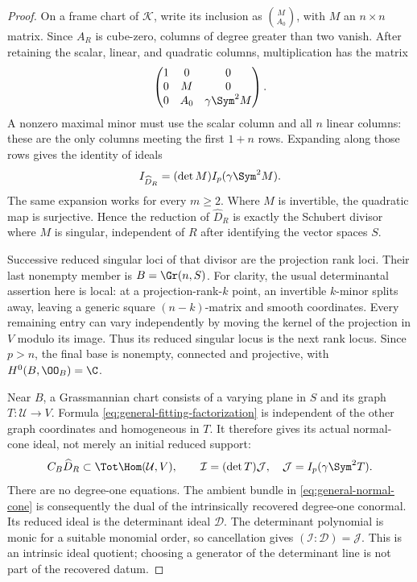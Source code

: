 \begin{proof}
On a frame chart of \(\mathcal K\), write its inclusion as
\(\binom M{A_0}\), with \(M\) an \(n\times n\) matrix.  Since
\(A_R\) is cube-zero, columns of degree greater than two vanish.
After retaining the scalar, linear, and quadratic columns, multiplication
has the matrix
\begin{equation}\label{eq:general-multiplication-matrix}
 \begin{pmatrix}
  1&0&0\\
  0&M&0\\
  0&A_0&\gamma\Sym^2M
 \end{pmatrix}.
\end{equation}
A nonzero maximal minor must use the scalar column and all \(n\)
linear columns: these are the only columns meeting the first \(1+n\)
rows.  Expanding along those rows gives the identity of ideals
\begin{equation}\label{eq:general-fitting-factorization}
 I_{\widehat D_R}=(\det M)I_p(\gamma\Sym^2M).
\end{equation}
The same expansion works for every \(m\ge2\).  Where \(M\) is
invertible, the quadratic map is surjective.  Hence the reduction of
\(\widehat D_R\) is exactly the Schubert divisor where \(M\)
is singular, independent of \(R\) after identifying the vector
spaces \(S\).

Successive reduced singular loci of that divisor are the projection
rank loci.  Their last nonempty member is \(B=\Gr(n,S)\).
For clarity, the usual determinantal assertion here is local: at a
projection-rank-\(k\) point, an invertible \(k\)-minor splits
away, leaving a generic square \((n-k)\)-matrix and smooth
coordinates.  Every remaining entry can vary independently by
moving the kernel of the projection in \(V\) modulo its image.
Thus its reduced singular locus is the next rank locus.  Since
\(p>n\), the final base is nonempty, connected and projective,
with \(H^0(B,\OO_B)=\C\).

Near \(B\), a Grassmannian chart consists of a varying plane in
\(S\) and its graph \(T:\mathcal U\to V\).  Formula
\eqref{eq:general-fitting-factorization} is independent of the other
graph coordinates and homogeneous in \(T\).  It therefore gives
its actual normal-cone ideal, not merely an initial reduced support:
\begin{equation}\label{eq:general-normal-cone}
 C_B\widehat D_R\subset\Tot\Hom(\mathcal U,V),\qquad
 \mathcal I=(\det T)\mathcal J,\quad
 \mathcal J=I_p(\gamma\Sym^2T).
\end{equation}
There are no degree-one equations.  The ambient bundle in
\eqref{eq:general-normal-cone} is consequently the dual of the
intrinsically recovered degree-one conormal.  Its reduced ideal is
the determinant ideal \(\mathcal D\).  The determinant polynomial
is monic for a suitable monomial order, so cancellation gives
\((\mathcal I:\mathcal D)=\mathcal J\).  This is an intrinsic
ideal quotient; choosing a generator of the determinant line is not
part of the recovered datum.


\end{proof}
